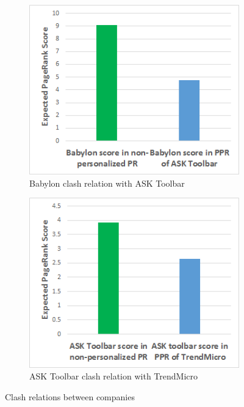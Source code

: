 \documentclass[11pt,oneside]{book}
\begin{document}
\begin{figure}[h]
\centering
\begin{subfigure}[b]{0.8\textwidth}
	\centering
\includegraphics[scale=0.8]{figures/babylon_clash_ask.png}
\caption{Babylon clash relation with ASK Toolbar}
\label{fig:babylon_clash_ask}
\end{subfigure}
\begin{subfigure}[b]{0.8\textwidth}
	\centering
\includegraphics[scale=0.8]{figures/ask_clash_trend.png}
\caption{ASK Toolbar clash relation with TrendMicro}
\label{fig:ask_clash_trend}
\end{subfigure}
\caption{Clash relations between companies}
	\label{fig:clash_1}
\end{figure}
\end{document}
